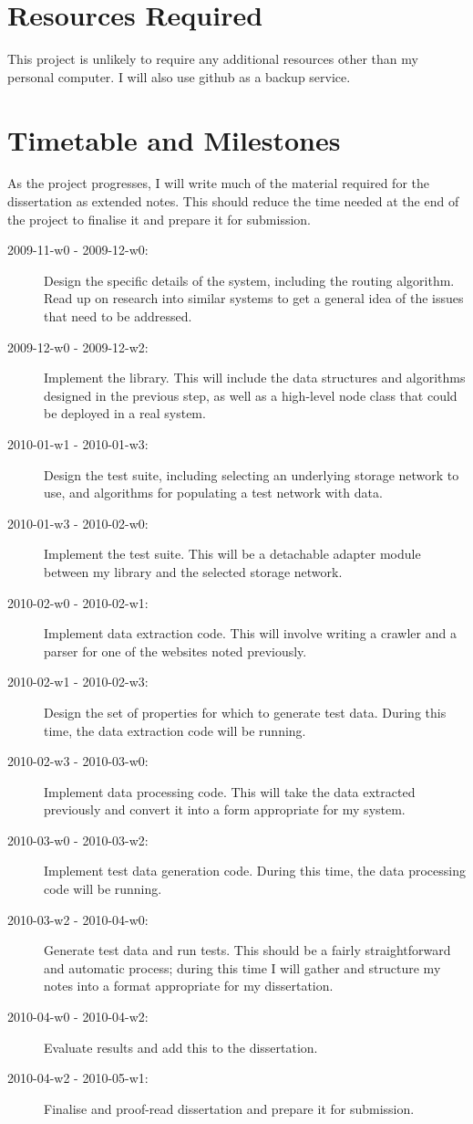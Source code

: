 \documentclass[12pt]{article}
\begin{document}
\section*{Resources Required}

This project is unlikely to require any additional resources other than my
personal computer. I will also use github as a backup service.


\section*{Timetable and Milestones}

As the project progresses, I will write much of the material required for the
dissertation as extended notes. This should reduce the time needed at the end
of the project to finalise it and prepare it for submission.

\begin{description}
\item [2009-11-w0 - 2009-12-w0:] Design the specific details of the system, including the routing algorithm. Read up on research into similar systems to get a general idea of the issues that need to be addressed.
\item [2009-12-w0 - 2009-12-w2:] Implement the library. This will include the data structures and algorithms designed in the previous step, as well as a high-level node class that could be deployed in a real system.
\item [2010-01-w1 - 2010-01-w3:] Design the test suite, including selecting an underlying storage network to use, and algorithms for populating a test network with data.
\item [2010-01-w3 - 2010-02-w0:] Implement the test suite. This will be a detachable adapter module between my library and the selected storage network.
\item [2010-02-w0 - 2010-02-w1:] Implement data extraction code. This will involve writing a crawler and a parser for one of the websites noted previously.
\item [2010-02-w1 - 2010-02-w3:] Design the set of properties for which to generate test data. During this time, the data extraction code will be running.
\item [2010-02-w3 - 2010-03-w0:] Implement data processing code. This will take the data extracted previously and convert it into a form appropriate for my system.
\item [2010-03-w0 - 2010-03-w2:] Implement test data generation code. During this time, the data processing code will be running.
\item [2010-03-w2 - 2010-04-w0:] Generate test data and run tests. This should be a fairly straightforward and automatic process; during this time I will gather and structure my notes into a format appropriate for my dissertation.
\item [2010-04-w0 - 2010-04-w2:] Evaluate results and add this to the dissertation.
\item [2010-04-w2 - 2010-05-w1:] Finalise and proof-read dissertation and prepare it for submission.
\end{description}
\end{document}
